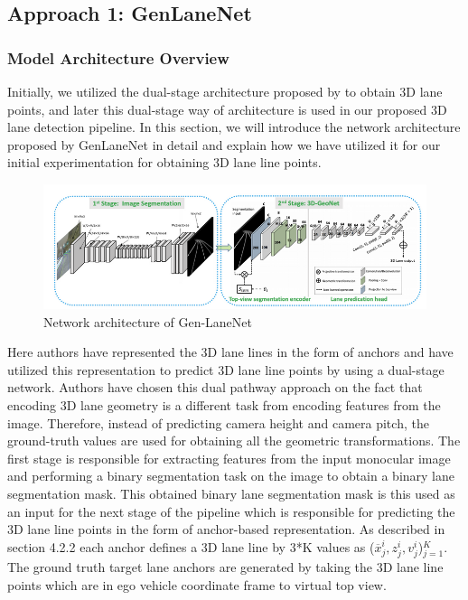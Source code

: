        \subsection{Approach 1: GenLaneNet\cite{guo2020gen}}
        
        \subsubsection{Model Architecture Overview}
        Initially, we utilized the dual-stage architecture proposed by \cite{guo2020gen} to obtain 3D lane points, and later this dual-stage way of architecture is used in our proposed 3D lane detection pipeline. In this section, we will introduce the network architecture proposed by GenLaneNet\cite{guo2020gen} in detail and explain how we have utilized it for our initial experimentation for obtaining 3D lane line points.
        
         \begin{figure}[h]
    \centering
    \includegraphics[width=13cm]{images/GenLaneNET.png}
    \caption{Network architecture of Gen-LaneNet \cite{guo2020gen}}
    \end{figure}
         
         Here authors have represented the 3D lane lines in the form of anchors and have utilized this representation to predict 3D lane line points by using a dual-stage network. Authors have chosen this dual pathway approach on the fact that encoding 3D lane geometry is a different task from encoding features from the image. Therefore, instead of predicting camera height and camera pitch, the ground-truth values are used for obtaining all the geometric transformations. 
         The first stage is responsible for extracting features from the input monocular image and performing a binary segmentation task on the image to obtain a binary lane segmentation mask. This obtained binary lane segmentation mask is this used as an input for the next stage of the pipeline which is responsible for predicting the 3D lane line points in the form of anchor-based representation. As described in section 4.2.2 each anchor defines a 3D lane line by 3*K values as ($\overline{x}^{i}_{j},z^{i}_{j},v^{i}_{j}$)$^{K}_{j=1}$. The ground truth target lane anchors are generated by taking the 3D lane line points which are in ego vehicle coordinate frame to virtual top view.
         
